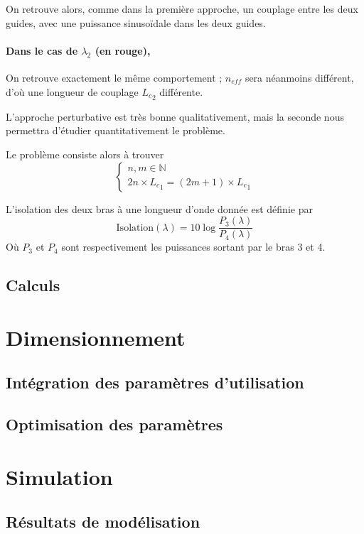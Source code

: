 \documentclass[a4paper,11pt]{report}
\begin{document}
On retrouve alors, comme dans la première approche, un couplage entre les deux guides, avec une puissance sinusoïdale dans les deux guides.

\subsubsection*{Dans le cas de $\lambda_2$ (en rouge),}
On retrouve exactement le même comportement ; $n_{eff}$ sera néanmoins différent, d'où une longueur de couplage ${L_c}_2$ différente.


L'approche perturbative est très bonne qualitativement, mais la seconde nous permettra d'étudier quantitativement le problème.

Le problème consiste alors à trouver 
\[
\left\{
    \begin{array}{ll}
    n, m\in \mathbb{N} \\
    2n\times {L_c}_1 = (2m+1)\times {L_c}_1

    \end{array}
\right.
\]

L'isolation des deux bras à une longueur d'onde donnée est définie par
\[\text{Isolation}(\lambda) = 10 \log\frac{P_3(\lambda)}{P_4(\lambda)}
\]
Où $P_3$ et $P_4$ sont respectivement les puissances sortant par le bras 3 et 4.

\section{Calculs}%
\chapter{Dimensionnement}
\section{Intégration des paramètres d'utilisation}
\section{Optimisation des paramètres}
\chapter{Simulation} 
\section{Résultats de modélisation}
\end{document}
